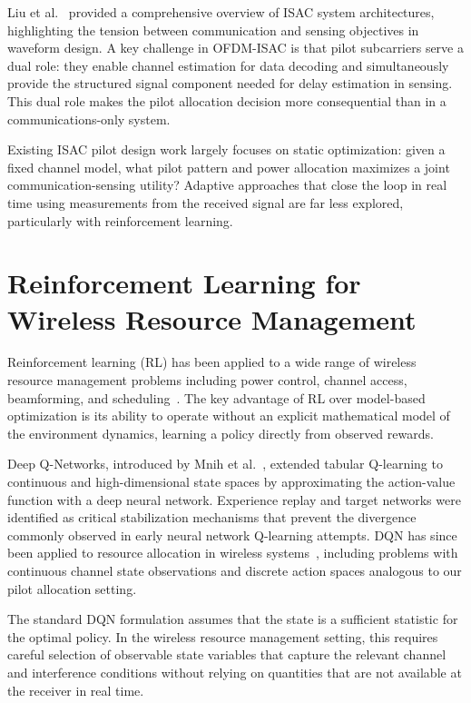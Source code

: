 Liu et al.~\cite{liu2022integrated} provided a comprehensive overview of ISAC system architectures, highlighting the tension between communication and sensing objectives in waveform design. A key challenge in OFDM-ISAC is that pilot subcarriers serve a dual role: they enable channel estimation for data decoding and simultaneously provide the structured signal component needed for delay estimation in sensing. This dual role makes the pilot allocation decision more consequential than in a communications-only system.

Existing ISAC pilot design work largely focuses on static optimization: given a fixed channel model, what pilot pattern and power allocation maximizes a joint communication-sensing utility? Adaptive approaches that close the loop in real time using measurements from the received signal are far less explored, particularly with reinforcement learning.

\section{Reinforcement Learning for Wireless Resource Management}

Reinforcement learning (RL) has been applied to a wide range of wireless resource management problems including power control, channel access, beamforming, and scheduling~\cite{luong2019applications}. The key advantage of RL over model-based optimization is its ability to operate without an explicit mathematical model of the environment dynamics, learning a policy directly from observed rewards.

Deep Q-Networks, introduced by Mnih et al.~\cite{mnih2015human}, extended tabular Q-learning to continuous and high-dimensional state spaces by approximating the action-value function with a deep neural network. Experience replay and target networks were identified as critical stabilization mechanisms that prevent the divergence commonly observed in early neural network Q-learning attempts. DQN has since been applied to resource allocation in wireless systems~\cite{luong2019applications}, including problems with continuous channel state observations and discrete action spaces analogous to our pilot allocation setting.

The standard DQN formulation assumes that the state is a sufficient statistic for the optimal policy. In the wireless resource management setting, this requires careful selection of observable state variables that capture the relevant channel and interference conditions without relying on quantities that are not available at the receiver in real time.

